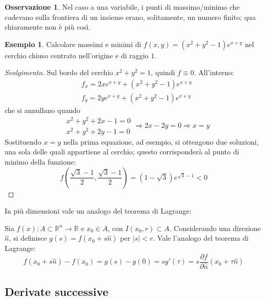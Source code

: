 \documentclass[11pt, a4paper]{scrartcl}
\newenvironment{svolgimento}{\renewcommand\qedsymbol{$\blacksquare$}\begin{proof}[Svolgimento]}{\end{proof}}
\theoremstyle{definition}
\newtheorem{esempio}{Esempio}
\numberwithin{esempio}{section}
\theoremstyle{definition}
\newtheorem{obs}{Osservazione}
\numberwithin{obs}{section}
\numberwithin{nota}{section}
\numberwithin{equation}{subsection}
\begin{document}
\begin{obs}
	Nel caso a una variabile, i punti di massimo/minimo che cadevano sulla frontiera di un insieme erano, solitamente, un numero finito; qua chiaramente non \`e pi\`u cos\`i.
\end{obs}
\begin{esempio}
	Calcolare massimi e minimi di $f(x,y) = (x^2 + y^2 - 1)e^{x+y} $ nel cerchio chiuso centrato nell'origine e di raggio $1$.
	\begin{svolgimento}
		Sul bordo del cerchio $x^2 + y^2 = 1$, quindi $f\equiv 0$. All'interno:
		\[
			\begin{split}
				&f_x = 2x e^{x+y}  + (x^2 + y^2 -1)e^{x+y} \\
				&f_y = 2y e^{x+y} + (x^2 + y^2 - 1) e^{x+y} 
			\end{split}
		\] 
	che si annullano quando 
	\[
	\begin{split}
		&x^2 + y^2 + 2x - 1 = 0\\
		&x^2 + y^2 + 2y - 1 = 0
	\end{split}\Rightarrow 2x - 2y = 0 \Rightarrow x=y
	\] 
Sostituendo $x=y$ nella prima equazione, ad esempio, si ottengono due soluzioni, una sola delle quali appartiene al cerchio; questo corrisponder\`a al punto di minimo della funzione:
\[
f\left(\frac{\sqrt{3} -1}{2}, \frac{\sqrt{3} -1}{2}\right) = (1-\sqrt{3} ) e^{\sqrt{3} -1}  < 0
\] 
\end{svolgimento}
\end{esempio}
\noindent In pi\`u dimensioni vale un analogo del teorema di Lagrange:
\begin{teorema}
	{}{}
	Sia $f(x) : A \subset \mathbb{R}^n \to \mathbb{R}$ e $x_0 \in A$, con $I(x_0,r) \subset A$. Considerando una direzione $\hat{n}$, si definisce $g(s) = f(x_0+ s \hat{n})$ per $\lvert s \rvert <r$. Vale l'analogo del teorema di Lagrange:
	\begin{equation}
		f(x_0+s\hat{n}) - f(x_0) = g(s) - g(0) = s g'(\tau ) = s \frac{\partial f}{\partial \hat{n}} (x_0 + \tau \hat{n})
	\end{equation}
\end{teorema}

\subsection{Derivate successive}
\end{document}
